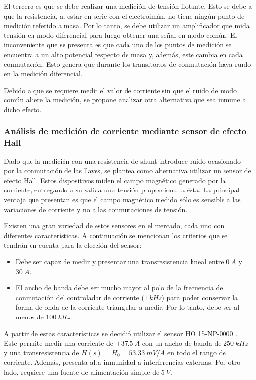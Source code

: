 El tercero es que se debe realizar una medición de tensión flotante. Esto se debe a que la resistencia, al estar en serie con el electroimán, no tiene ningún punto de medición referido a masa. Por lo tanto, se debe utilizar un amplificador que mida tensión en modo diferencial para luego obtener una señal en modo común. El inconveniente que se presenta es que cada uno de los puntos de medición se encuentra a un alto potencial respecto de masa y, además, este cambia en cada conmutación. Esto genera que durante los transitorios de conmutación haya ruido en la medición diferencial.

Debido a que se requiere medir el valor de corriente sin que el ruido de modo común altere la medición, se propone analizar otra alternativa que sea inmune a dicho efecto.


\subsubsection{Análisis de medición de corriente mediante sensor de efecto Hall}

Dado que la medición con una resistencia de shunt introduce ruido ocasionado por la conmutación de las llaves, se plantea como alternativa utilizar un sensor de efecto Hall. Estos dispositivos miden el campo magnético generado por la corriente, entregando a su salida una tensión proporcional a ésta. La principal ventaja que presentan es que el campo magnético medido sólo es sensible a las variaciones de corriente y no a las conmutaciones de tensión.

Existen una gran variedad de estos sensores en el mercado, cada uno con diferentes características. A continuación se mencionan los criterios que se tendrán en cuenta para la elección del sensor:

\begin{itemize}
	\item Debe ser capaz de medir y presentar una transresistencia lineal entre $0\:A$ y $30\:A$.
	\item El ancho de banda debe ser mucho mayor al polo de la frecuencia de conmutación del controlador de corriente ($1\:kHz$) para poder conservar la forma de onda de la corriente triangular a medir. Por lo tanto, debe ser al menos de $100\:kHz$.	
\end{itemize}

A partir de estas características se decidió utilizar el sensor HO 15-NP-0000 \cite{HO15-NP}. Este permite medir una corriente de $\pm 37.5\:A$ con un ancho de banda de $250\:kHz$ y una transresistencia de $H(s)=H_0=53.33\:mV/A$ en todo  el rango de corriente. Además, presenta alta inmunidad a interferencias externas. Por otro lado, requiere una fuente de alimentación simple de $5\:V$.

